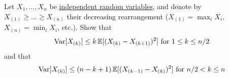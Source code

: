   \begin{exercise}
  Let $X_1, \ldots, X_n$ be \hyperref[prob-def:independent-random-variables]{independent random variables}, and denote by $X_{(1)} \geq \ldots \geq X_{(n)}$ their decreasing rearrangement ($X_{(1)} = \max_i X_i$, $X_{(n)} = \min_i X_i$, etc.). Show that 
  \begin{equation}
    \operatorname{Var}[X_{(k)}] \leq k \, \mathbb{E}[(X_{(k)} - X_{(k+1)})^2] \text{ for } 1 \leq k \leq n/2
  \end{equation}
  and that 
  \begin{equation}
    \operatorname{Var}[X_{(k)}] \leq (n - k + 1)\, \mathbb{E}[(X_{(k-1)} - X_{(k)})^2] \text{ for } n/2 < k \leq n
  \end{equation}
  \end{exercise}

